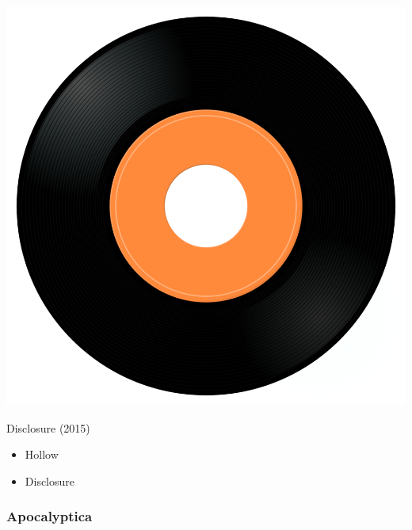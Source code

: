 \begin{minipage}[t]{0.25\textwidth}
\captionsetup{type=figure}
\includegraphics[width=\textwidth]{Images/cover.png}
\caption*{Disclosure (2015)}
\end{minipage}
\begin{minipage}[t]{0.25\textwidth}\vspace{0pt}
\begin{itemize}[nosep,leftmargin=1em,labelwidth=*,align=left]
	\setlength{\itemsep}{0pt}
	\item Hollow
	\item Disclosure
\end{itemize}
\end{minipage}

\subsubsection{Apocalyptica}

